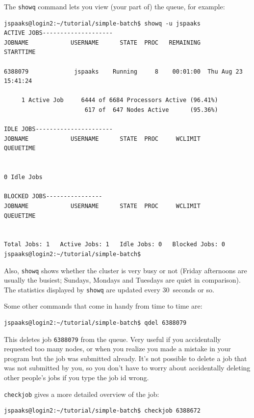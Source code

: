 {The \lstinline[style=bashinline]{showq} command lets you view (your part of) the queue, for example:
\begin{lstlisting}[style=basic,style=bash]
jspaaks@login2:~/tutorial/simple-batch$ showq -u jspaaks
ACTIVE JOBS--------------------
JOBNAME            USERNAME      STATE  PROC   REMAINING            STARTTIME

6388079             jspaaks    Running     8    00:01:00  Thu Aug 23 15:41:24

     1 Active Job     6444 of 6684 Processors Active (96.41%)
                       617 of  647 Nodes Active      (95.36%)

IDLE JOBS----------------------
JOBNAME            USERNAME      STATE  PROC     WCLIMIT            QUEUETIME


0 Idle Jobs

BLOCKED JOBS----------------
JOBNAME            USERNAME      STATE  PROC     WCLIMIT            QUEUETIME


Total Jobs: 1   Active Jobs: 1   Idle Jobs: 0   Blocked Jobs: 0
jspaaks@login2:~/tutorial/simple-batch$
\end{lstlisting}
Also, \lstinline[style=bashinline]{showq} shows whether the cluster is very busy or not (Friday afternoons are usually the busiest; Sundays, Mondays and Tuesdays are quiet in comparison). The statistics displayed by \lstinline[style=bashinline]{showq} are updated every 30~seconds or so.


Some other commands that come in handy from time to time are:
\begin{lstlisting}[style=basic,style=bash]
jspaaks@login2:~/tutorial/simple-batch$ qdel 6388079
\end{lstlisting}
This deletes job \lstinline[style=bashinline]{6388079} from the queue. Very useful if you accidentally requested too many nodes, or when you realize you made a mistake in your program but the job was submitted already. It's not possible to delete a job that was not submitted by you, so you don't have to worry about accidentally deleting other people's jobs if you type the job id wrong.

\vspace{1em}

\lstinline[style=bashinline]{checkjob} gives a more detailed overview of the job:
\begin{lstlisting}[style=basic,style=bash]
jspaaks@login2:~/tutorial/simple-batch$ checkjob 6388672



\end{lstlisting}}
